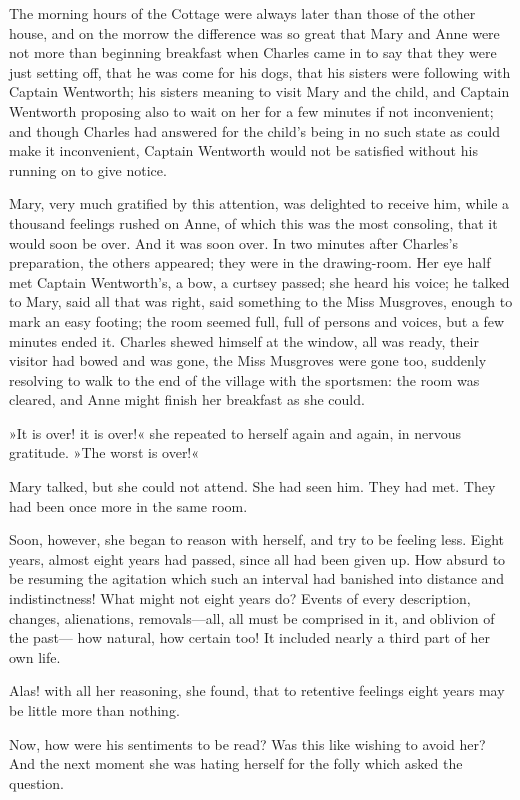 The morning hours of the Cottage were always later than those of the other house, and on the morrow the difference was so great that Mary and Anne were not more than beginning breakfast when Charles came in to say that they were just setting off, that he was come for his dogs, that his sisters were following with Captain Wentworth; his sisters meaning to visit Mary and the child, and Captain Wentworth proposing also to wait on her for a few minutes if not inconvenient; and though Charles had answered for the child's being in no such state as could make it inconvenient, Captain Wentworth would not be satisfied without his running on to give notice.

Mary, very much gratified by this attention, was delighted to receive him, while a thousand feelings rushed on Anne, of which this was the most consoling, that it would soon be over. And it was soon over. In two minutes after Charles's preparation, the others appeared; they were in the drawing-room. Her eye half met Captain Wentworth's, a bow, a curtsey passed; she heard his voice; he talked to Mary, said all that was right, said something to the Miss Musgroves, enough to mark an easy footing; the room seemed full, full of persons and voices, but a few minutes ended it. Charles shewed himself at the window, all was ready, their visitor had bowed and was gone, the Miss Musgroves were gone too, suddenly resolving to walk to the end of the village with the sportsmen: the room was cleared, and Anne might finish her breakfast as she could.

»It is over! it is over!« she repeated to herself again and again, in nervous gratitude. »The worst is over!«

Mary talked, but she could not attend. She had seen him. They had met. They had been once more in the same room.

Soon, however, she began to reason with herself, and try to be feeling less. Eight years, almost eight years had passed, since all had been given up. How absurd to be resuming the agitation which such an interval had banished into distance and indistinctness! What might not eight years do? Events of every description, changes, alienations, removals—all, all must be comprised in it, and oblivion of the past— how natural, how certain too! It included nearly a third part of her own life.

Alas! with all her reasoning, she found, that to retentive feelings eight years may be little more than nothing.

Now, how were his sentiments to be read? Was this like wishing to avoid her? And the next moment she was hating herself for the folly which asked the question.

